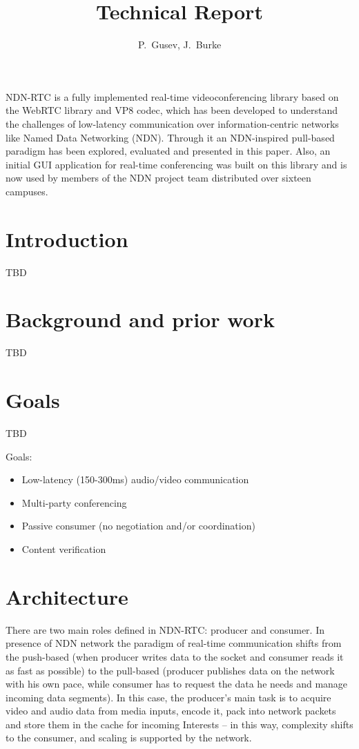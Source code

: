 \documentclass[10pt]{icn/sig-alternate-10pt} %
\author{P.~Gusev, J.~Burke}
\title{\ndnrtcName{} Technical Report}
\newcommand{\ndnrtcName}{NDN-RTC} %
\begin{document}
\maketitle

\abstract
\ndnrtcName{} is a fully implemented real-time videoconferencing library based on the WebRTC library and VP8 codec, which has been developed to understand the challenges of low-latency communication over information-centric networks like Named Data Networking (NDN). Through it an NDN-inspired pull-based paradigm has been explored, evaluated and presented in this paper. Also, an initial GUI application for real-time conferencing was built on this library and is now used by members of the NDN project team distributed over sixteen campuses.

\section{Introduction}
TBD

\section{Background and prior work}
TBD

\section{Goals}
TBD

Goals:

\begin{itemize}
\item Low-latency (150-300ms) audio/video communication
\item Multi-party conferencing
\item Passive consumer (no negotiation and/or coordination)
\item Content verification
\end{itemize}

\section{Architecture}
There are two main roles defined in \ndnrtcName{}: producer and consumer. In presence of NDN network the paradigm of real-time communication shifts from the push-based (when producer writes data to the socket and consumer reads it as fast as possible) to the pull-based (producer publishes data on the network with his own pace, while consumer has to request the data he needs and manage incoming data segments).
In this case, the producer’s main task is to acquire video and audio data from media inputs, encode it, pack into network packets and store them in the cache for incoming Interests – in this way, complexity shifts to the consumer, and scaling is supported by the network.
\end{document}
